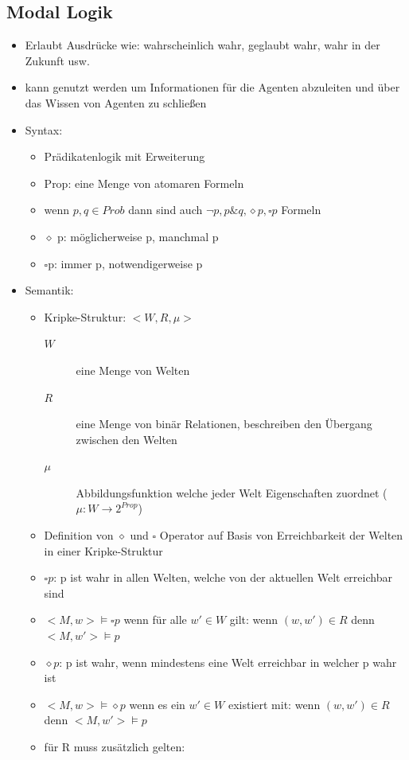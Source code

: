 \documentclass{article} %
\begin{document}
	\subsection{Modal Logik}
	\begin{itemize}
		\item Erlaubt Ausdrücke wie: wahrscheinlich wahr, geglaubt wahr, wahr in der Zukunft usw.
		\item kann genutzt werden um Informationen für die Agenten abzuleiten und über das Wissen von Agenten zu schließen
		\item Syntax:
		\begin{itemize}
			\item Prädikatenlogik mit Erweiterung
			\item Prop: eine Menge von atomaren Formeln
			\item wenn $p,q \in Prob$ dann sind auch $\neg p, p \& q, \diamond p,\square p$ Formeln
			\item $\diamond$ p: möglicherweise p, manchmal p 
			\item $\square$p: immer p, notwendigerweise p
		\end{itemize}
		\item Semantik:
		\begin{itemize}
			\item Kripke-Struktur: $<W,R,\mu>$
			\begin{description}
				\item[$W$] eine Menge von Welten
				\item[$R$] eine Menge von binär Relationen, beschreiben den Übergang zwischen den Welten
				\item[$\mu$] Abbildungsfunktion welche jeder Welt Eigenschaften zuordnet ($\mu : W \rightarrow 2^{Prop}$)
			\end{description}
			\item Definition von $\diamond$ und $\square$ Operator auf Basis von Erreichbarkeit der Welten in einer Kripke-Struktur
			\item $\square p$: p ist wahr in allen Welten, welche von der aktuellen Welt erreichbar sind
			\item $<M,w>\vDash\square p$ wenn für alle $w' \in W$ gilt: wenn $(w,w') \in R$ denn $<M,w'>\vDash p$
			\item $\diamond p$: p ist wahr, wenn mindestens eine Welt erreichbar in welcher p wahr ist
			\item $<M,w>\vDash\diamond p$ wenn es ein $w' \in W$ existiert mit:  wenn $(w,w') \in R$ denn $<M,w'>\vDash p$
			\item für R muss zusätzlich gelten:

\end{itemize}
\end{itemize}
\end{document}
